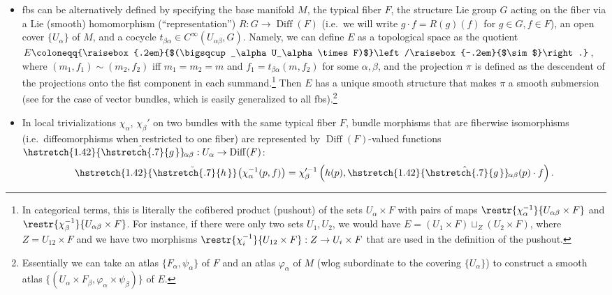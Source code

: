 \documentclass[english,letterpaper]{article}%
\numberwithin{equation}{section}
\numberwithin{figure}{section}
\numberwithin{table}{section}
\theoremstyle{definition}
\theoremstyle{definition}
\theoremstyle{definition}
\theoremstyle{plain}
\theoremstyle{plain}
\theoremstyle{plain}
\theoremstyle{plain}
\theoremstyle{remark}
\theoremstyle{remark}
\DeclareMathOperator{\Diff}{Diff}
\newcommand{\bigslant}[2]{{\raisebox{.2em}{$#1$}\left/\raisebox{-.2em}{$#2$}\right.}}
\newcommand\wh[1]{\hstretch{1.42}{\hat{\hstretch{.7}{#1\mkern2mu}}}\mkern-2mu} %
\newcommand\wt[1]{\hstretch{1.42}{\tilde{\hstretch{.7}{#1\mkern2mu}}}\mkern-2mu}
\begin{document}
\begin{defn}
\begin{itemize}
    \item \Glspl{fb} can be alternatively defined by specifying the base manifold $M$, the typical fiber $F$, the structure Lie group $G$ acting on the fiber via a Lie (smooth) homomorphism (``representation'') $R:G\to \Diff(F)$ (i.e.\ we will write $g\cdot f=R(g)(f)$ for $g\in G, f\in F$), an open cover $\{U_\alpha\}$ of $M$, and a cocycle  $t_{\beta\alpha}\in C^\infty (U_{\alpha\beta}, G)$. Namely, we can define $E$ as a topological space as the quotient $E\coloneqq \bigslant{(\bigsqcup_\alpha U_\alpha \times F)}{\sim}$, where $(m_1,f_1)\sim(m_2,f_2)$ iff $m_1=m_2=m$ and $f_1=t_{\beta\alpha}(m,f_2)$ for some $\alpha,\beta$, and the projection $\pi$ is defined as the descendent of the projections onto the fist component in each summand.\footnote{In categorical terms, this is literally the cofibered product (pushout) of the sets $U_\alpha \times F$ with pairs of maps $\restr{\chi_\alpha^{-1}}{U_{\alpha\beta}\times F}$ and $\restr{\chi_\beta^{-1}}{U_{\alpha\beta}\times F}$. For instance, if there were only two sets $U_1,U_2$, we would have $E=(U_1\times F)\sqcup_Z (U_2\times F)$, where $Z=U_{12}\times F$ and we have two morphisms $\restr{\chi_i^{-1}}{U_{12}\times F}:Z\to U_i\times F$ that are used in the definition of the pushout.} Then $E$ has a unique smooth structure that makes $\pi$ a smooth submersion (see \cite[Lm. 10.6]{Lee} for the case of vector bundles, which is easily generalized to all \glspl{fb}).\footnote{Essentially we can take an atlas $\{F_\alpha,\psi_\alpha\}$ of $F$ and an atlas $\varphi_\alpha$ of $M$ (\gls{wlog} subordinate to the covering $\{U_\alpha\}$) to construct a smooth atlas $\{(U_\alpha\times F_\beta,\varphi_\alpha\times\psi_\beta)\}$ of $E$.}
    
    \item In local trivializations $\chi_\alpha$, $\chi_\beta'$ on two bundles with the same typical fiber $F$, bundle morphisms that are fiberwise isomorphisms (i.e.\ diffeomorphisms when restricted to one fiber) are represented by $\Diff(F)$-valued functions $\wh{g}_{\alpha\beta}:U_\alpha\to \Diff(F)$: \[\wt{h}\left(\chi_\alpha^{-1}(p,f)\right)=\chi_\beta^{\prime-1}\left(h(p),\wh{g}_{\alpha\beta}(p)\cdot f\right).\]
\end{itemize}
\end{defn}
\end{document}
